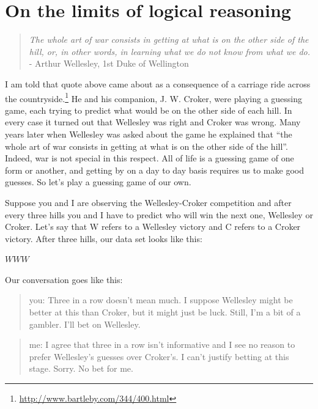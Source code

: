 \documentclass[
  letterpaper,
]{book}
\begin{document}
\hypertarget{on-the-limits-of-logical-reasoning}{%
\section*{On the limits of logical
reasoning}\label{on-the-limits-of-logical-reasoning}}

\begin{quote}
\emph{The whole art of war consists in getting at what is on the other
side of the hill, or, in other words, in learning what we do not know
from what we do.}\\
- Arthur Wellesley, 1st Duke of Wellington
\end{quote}

I am told that quote above came about as a consequence of a carriage
ride across the countryside.\footnote{\href{\%0A\%20http://www.bartleby.com/344/400.html}{http://www.bartleby.com/344/400.html}}
He and his companion, J. W. Croker, were playing a guessing game, each
trying to predict what would be on the other side of each hill. In every
case it turned out that Wellesley was right and Croker was wrong. Many
years later when Wellesley was asked about the game he explained that
``the whole art of war consists in getting at what is on the other side
of the hill''. Indeed, war is not special in this respect. All of life
is a guessing game of one form or another, and getting by on a day to
day basis requires us to make good guesses. So let's play a guessing
game of our own.

Suppose you and I are observing the Wellesley-Croker competition and
after every three hills you and I have to predict who will win the next
one, Wellesley or Croker. Let's say that W refers to a Wellesley victory
and C refers to a Croker victory. After three hills, our data set looks
like this:

\(WWW\)

Our conversation goes like this:

\begin{quote}
you: Three in a row doesn't mean much. I suppose Wellesley might be
better at this than Croker, but it might just be luck. Still, I'm a bit
of a gambler. I'll bet on Wellesley.
\end{quote}

\begin{quote}
me: I agree that three in a row isn't informative and I see no reason to
prefer Wellesley's guesses over Croker's. I can't justify betting at
this stage. Sorry. No bet for me.
\end{quote}
\end{document}
